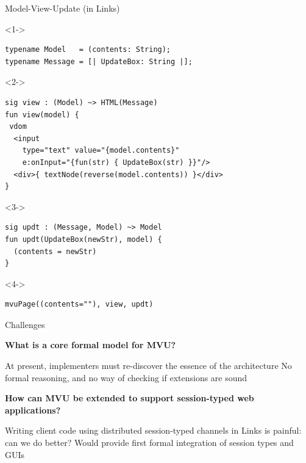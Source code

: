 \documentclass[11.5pt, aspectratio=169]{beamer}
\begin{document}
\begin{frame}[fragile]{Model-View-Update (in Links)}

\vspace{-1em}
\begin{overlayarea}{\linewidth}{10cm}
\begin{uncoverenv}<1->
\begin{lstlisting}[language=Links]
typename Model   = (contents: String);
typename Message = [| UpdateBox: String |];
\end{lstlisting}
\end{uncoverenv}

\begin{uncoverenv}<2->
\begin{lstlisting}[language=Links]
sig view : (Model) ~> HTML(Message)
fun view(model) {
 vdom
  <input
    type="text" value="{model.contents}"
    e:onInput="{fun(str) { UpdateBox(str) }}"/>
  <div>{ textNode(reverse(model.contents)) }</div>
}
\end{lstlisting}
\end{uncoverenv}

  \begin{uncoverenv}<3->
\begin{lstlisting}[language=Links]
sig updt : (Message, Model) ~> Model
fun updt(UpdateBox(newStr), model) {
  (contents = newStr)
}
\end{lstlisting}
\end{uncoverenv}

  \begin{uncoverenv}<4->
\begin{lstlisting}[language=Links]
mvuPage((contents=""), view, updt)
\end{lstlisting}
\end{uncoverenv}
\end{overlayarea}
\end{frame}

\begin{frame}{Challenges}

    \begin{fullpageitemize}
  \item {\Large \textbf{What is a core formal model for MVU?}}
    \begin{itemize}
      \itemR At present, implementers must re-discover the essence of the architecture
      \itemR No formal reasoning, and no way of checking if extensions are sound
    \end{itemize}
    \vspace{1em}
  \item {\Large \textbf{How can MVU be extended to support session-typed web applications?}}
    \begin{itemize}
      \itemR Writing client code using distributed session-typed channels in Links is painful: can we do better?
      \itemR Would provide first formal integration of session types and GUIs
    \end{itemize}
  \end{fullpageitemize}
\end{frame}
\end{document}
